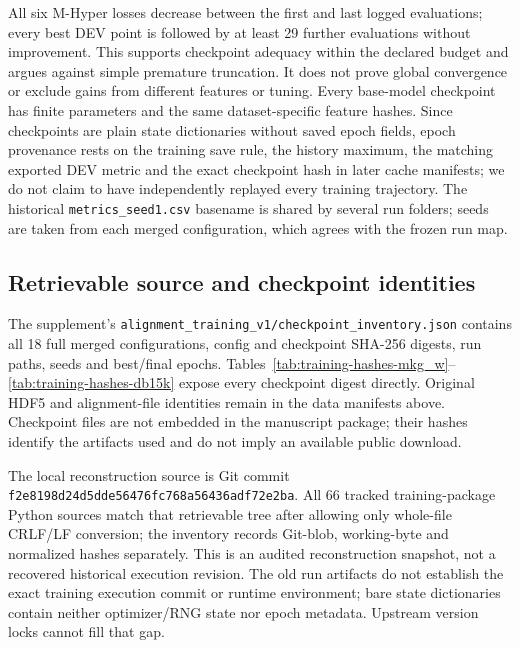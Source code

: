 \documentclass[11pt,a4paper]{article}
\begin{document}

All six M-Hyper losses decrease between the first and last logged evaluations; every best DEV point is followed by at least 29 further evaluations without improvement. This supports checkpoint adequacy within the declared budget and argues against simple premature truncation. It does not prove global convergence or exclude gains from different features or tuning. Every base-model checkpoint has finite parameters and the same dataset-specific feature hashes. Since checkpoints are plain state dictionaries without saved epoch fields, epoch provenance rests on the training save rule, the history maximum, the matching exported DEV metric and the exact checkpoint hash in later cache manifests; we do not claim to have independently replayed every training trajectory. The historical \texttt{metrics\_seed1.csv} basename is shared by several run folders; seeds are taken from each merged configuration, which agrees with the frozen run map.

\FloatBarrier
\subsection{Retrievable source and checkpoint identities}


The supplement's \texttt{alignment\_training\_v1/checkpoint\_inventory.json} contains all 18 full merged configurations, config and checkpoint SHA-256 digests, run paths, seeds and best/final epochs. Tables~\ref{tab:training-hashes-mkg_w}--\ref{tab:training-hashes-db15k} expose every checkpoint digest directly. Original HDF5 and alignment-file identities remain in the data manifests above. Checkpoint files are not embedded in the manuscript package; their hashes identify the artifacts used and do not imply an available public download.

The local reconstruction source is Git commit \texttt{f2e8198d24d5dde56476fc768a56436adf72e2ba}. All 66 tracked training-package Python sources match that retrievable tree after allowing only whole-file CRLF/LF conversion; the inventory records Git-blob, working-byte and normalized hashes separately. This is an audited reconstruction snapshot, not a recovered historical execution revision. The old run artifacts do not establish the exact training execution commit or runtime environment; bare state dictionaries contain neither optimizer/RNG state nor epoch metadata. Upstream version locks cannot fill that gap.
\end{document}
